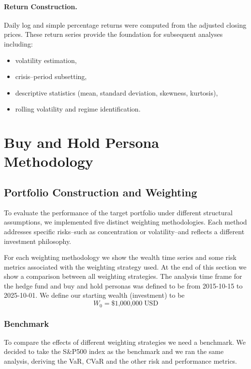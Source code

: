 \documentclass[12pt, a4paper]{article}
\begin{document}
	\paragraph{Return Construction.}
	Daily log and simple percentage returns were computed from the adjusted closing prices.  
	These return series provide the foundation for subsequent analyses including:
	\begin{itemize}
		\item volatility estimation,
		\item crisis–period subsetting,
		\item descriptive statistics (mean, standard deviation, skewness, kurtosis),
		\item rolling volatility and regime identification.
	\end{itemize}
	
	\section{Buy and Hold Persona Methodology}
	\subsection{Portfolio Construction and Weighting}
	\label{Weighting}
	
	To evaluate the performance of the target portfolio under different structural assumptions, we implemented five distinct weighting methodologies. Each method addresses specific risks--such as concentration or volatility--and reflects a different investment philosophy. 
	
	For each weighting methodology we show the wealth time series and some risk metrics associated with the weighting strategy used. At the end of this section we show a comparison between all weighting strategies. The analysis time frame for the hedge fund and buy and hold personas was defined to be from 2015-10-15 to 2025-10-01. We define our starting wealth (investment) to be
	$$W_0 = \$\text{1,000,000}\; \text{USD}$$ 
	
	\subsubsection{Benchmark}
	
	To compare the effects of different weighting strategies we need a benchmark. We decided to take the S\&P500 index as the benchmark and we ran the same analysis, deriving the VaR, CVaR and the other risk and performance metrics.
	
\end{document}
